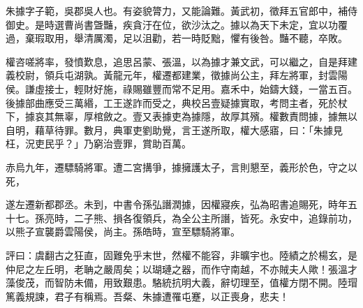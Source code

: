 \begin{pinyinscope}
 
 
 朱據字子範，吳郡吳人也。有姿貌膂力，又能論難。黃武初，徵拜五官郎中，補侍御史。是時選曹尚書曁豔，疾貪汙在位，欲沙汰之。據以為天下未定，宜以功覆過，棄瑕取用，舉清厲濁，足以沮勸，若一時貶黜，懼有後咎。豔不聽，卒敗。
 
 
 
 
 權咨嗟將率，發憤歎息，追思呂蒙、張溫，以為據才兼文武，可以繼之，自是拜建義校尉，領兵屯湖孰。黃龍元年，權遷都建業，徵據尚公主，拜左將軍，封雲陽侯。謙虛接士，輕財好施，祿賜雖豐而常不足用。嘉禾中，始鑄大錢，一當五百。後據部曲應受三萬緡，工王遂詐而受之，典校呂壹疑據實取，考問主者，死於杖下，據哀其無辜，厚棺斂之。壹又表據吏為據隱，故厚其殯。權數責問據，據無以自明，藉草待罪。數月，典軍吏劉助覺，言王遂所取，權大感寤，曰：「朱據見枉，況吏民乎？」乃窮治壹罪，賞助百萬。
 
 
 
 
 赤烏九年，遷驃騎將軍。遭二宮搆爭，據擁護太子，言則懇至，義形於色，守之以死，
 
 
 遂左遷新都郡丞。未到，中書令孫弘譖潤據，因權寢疾，弘為昭書追賜死，時年五十七。孫亮時，二子熊、損各復領兵，為全公主所譖，皆死。永安中，追錄前功，以熊子宣襲爵雲陽侯，尚主。孫皓時，宣至驃騎將軍。
 
 
 
 
 評曰：虞翻古之狂直，固難免乎末世，然權不能容，非曠宇也。陸績之於楊玄，是仲尼之左丘明，老聃之嚴周矣；以瑚璉之器，而作守南越，不亦賊夫人歟！張溫才藻俊茂，而智防未備，用致艱患。駱統抗明大義，辭切理至，值權方閉不開。陸瑁篤義規諫，君子有稱焉。吾粲、朱據遭罹屯蹇，以正喪身，悲夫！
 
 
\end{pinyinscope}